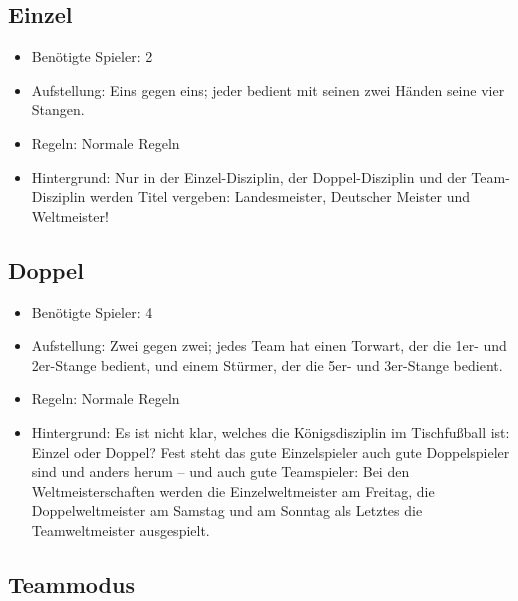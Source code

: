 \subsection{Einzel}
\label{spielformen:npersonen:einzel}

\begin{itemize}
\item Benötigte Spieler: 2
\item Aufstellung: Eins gegen eins; jeder bedient mit seinen zwei Händen seine vier Stangen.
\item Regeln: Normale Regeln 
\item Hintergrund: Nur in der Einzel-Disziplin, der Doppel-Disziplin und der Team-Disziplin werden Titel vergeben: Landesmeister, Deutscher Meister und Weltmeister!  
\end{itemize}
 
\subsection{Doppel}
\label{spielformen:npersonen:doppel}

\begin{itemize}
\item Benötigte Spieler: 4
\item Aufstellung: Zwei gegen zwei; jedes Team hat einen Torwart, der die 1er- und 2er-Stange bedient, und einem Stürmer, der die 5er- und 3er-Stange bedient.
\item Regeln: Normale Regeln 
\item Hintergrund: Es ist nicht klar, welches die Königsdisziplin im Tischfußball ist: Einzel oder Doppel? Fest steht das gute Einzelspieler auch gute Doppelspieler sind und anders herum -- und auch gute Teamspieler: Bei den Weltmeisterschaften werden die Einzelweltmeister am Freitag, die Doppelweltmeister am Samstag und am Sonntag als Letztes die Teamweltmeister ausgespielt. 
\end{itemize}

\subsection{Teammodus}
\label{spielformen:npersonen:team}

